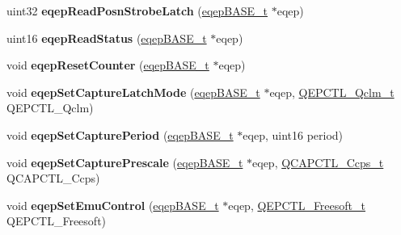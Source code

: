 \begin{DoxyCompactItemize}
\item 
\mbox{\label{group__eQEP_ga3a15299c9f35108df2a527e4e0d8f824}} 
uint32 {\bfseries eqep\+Read\+Posn\+Strobe\+Latch} (\mbox{\hyperlink{reg__eqep_8h_a794db63555812863c39c5d214fd4f215}{eqep\+B\+A\+S\+E\+\_\+t}} $\ast$eqep)
\item 
\mbox{\label{group__eQEP_ga8f1e349de24ba2f66ab1b67f0acb3a25}} 
uint16 {\bfseries eqep\+Read\+Status} (\mbox{\hyperlink{reg__eqep_8h_a794db63555812863c39c5d214fd4f215}{eqep\+B\+A\+S\+E\+\_\+t}} $\ast$eqep)
\item 
\mbox{\label{group__eQEP_ga1b6438a6827e2ad1363605b786a9f08c}} 
void {\bfseries eqep\+Reset\+Counter} (\mbox{\hyperlink{reg__eqep_8h_a794db63555812863c39c5d214fd4f215}{eqep\+B\+A\+S\+E\+\_\+t}} $\ast$eqep)
\item 
\mbox{\label{group__eQEP_ga4c86f75401efff3551ef511b75197c91}} 
void {\bfseries eqep\+Set\+Capture\+Latch\+Mode} (\mbox{\hyperlink{reg__eqep_8h_a794db63555812863c39c5d214fd4f215}{eqep\+B\+A\+S\+E\+\_\+t}} $\ast$eqep, \mbox{\hyperlink{eqep_8h_a1b50ca16d72d3ca37d4485d58d5e63cf}{Q\+E\+P\+C\+T\+L\+\_\+\+Qclm\+\_\+t}} Q\+E\+P\+C\+T\+L\+\_\+\+Qclm)
\item 
\mbox{\label{group__eQEP_ga42bd6b3dc9e8546814742c320029dcc8}} 
void {\bfseries eqep\+Set\+Capture\+Period} (\mbox{\hyperlink{reg__eqep_8h_a794db63555812863c39c5d214fd4f215}{eqep\+B\+A\+S\+E\+\_\+t}} $\ast$eqep, uint16 period)
\item 
\mbox{\label{group__eQEP_ga809ea9dd3fb8c28159cf471288e1fe90}} 
void {\bfseries eqep\+Set\+Capture\+Prescale} (\mbox{\hyperlink{reg__eqep_8h_a794db63555812863c39c5d214fd4f215}{eqep\+B\+A\+S\+E\+\_\+t}} $\ast$eqep, \mbox{\hyperlink{eqep_8h_a08f798e9373fc418750c942760fc87a8}{Q\+C\+A\+P\+C\+T\+L\+\_\+\+Ccps\+\_\+t}} Q\+C\+A\+P\+C\+T\+L\+\_\+\+Ccps)
\item 
\mbox{\label{group__eQEP_ga6a8f74e384e6e1697590d16da8b53e30}} 
void {\bfseries eqep\+Set\+Emu\+Control} (\mbox{\hyperlink{reg__eqep_8h_a794db63555812863c39c5d214fd4f215}{eqep\+B\+A\+S\+E\+\_\+t}} $\ast$eqep, \mbox{\hyperlink{eqep_8h_a2b1496a3443daa81aafc216c4a0195e9}{Q\+E\+P\+C\+T\+L\+\_\+\+Freesoft\+\_\+t}} Q\+E\+P\+C\+T\+L\+\_\+\+Freesoft)

\end{DoxyCompactItemize}
